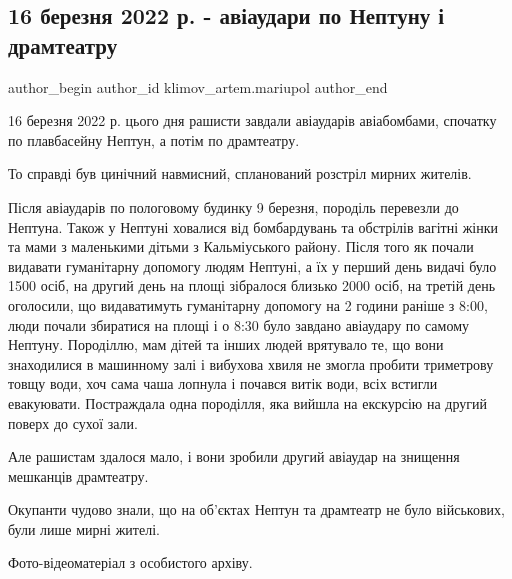  
 
 
 
 

\subsection{16 березня 2022 р. - авіаудари по Нептуну і драмтеатру}
\label{sec:16_03_2023.fb.klimov_artem.mariupol.1.16_bereznya_2022_r__}

\ifcmt
 author_begin
   author_id klimov_artem.mariupol
 author_end
\fi

16 березня 2022 р. цього дня рашисти завдали авіаударів авіабомбами, спочатку
по плавбасейну Нептун, а потім по драмтеатру.

То справді був цинічний навмисний, спланований розстріл мирних жителів.

Після авіаударів по пологовому будинку 9 березня, породіль перевезли до
Нептуна. Також у Нептуні ховалися від бомбардувань та обстрілів вагітні жінки
та мами з маленькими дітьми з Кальміуського району. Після того як почали
видавати гуманітарну допомогу людям Нептуні, а їх у перший день видачі було
1500 осіб, на другий день на площі зібралося близько 2000 осіб, на третій день
оголосили, що видаватимуть гуманітарну допомогу на 2 години раніше з 8:00, люди
почали збиратися на площі і о 8:30 було завдано авіаудару по самому Нептуну.
Породіллю, мам дітей та інших людей врятувало те, що вони знаходилися в
машинному залі і вибухова хвиля не змогла пробити триметрову товщу води, хоч
сама чаша лопнула і почався витік води, всіх встигли евакуювати. Постраждала
одна породілля, яка вийшла на екскурсію на другий поверх до сухої зали.

Але рашистам здалося мало, і вони зробили другий авіаудар на знищення мешканців
драмтеатру.

Окупанти чудово знали, що на об'єктах Нептун та драмтеатр не було військових,
були лише мирні жителі.

Фото-відеоматеріал з особистого архіву.


